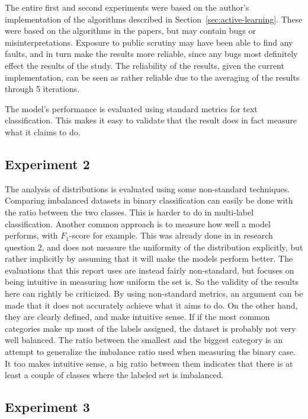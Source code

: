 The entire first and second experiments were based on the author's implementation of the algorithms described in Section~\ref{sec:active-learning}.
These were based on the algorithms in the papers, but may contain bugs or misinterpretations.
Exposure to public scrutiny may have been able to find any faults, and in turn make the results more reliable, since any bugs most definitely effect the results of the study.
The reliability of the results, given the current implementation, can be seen as rather reliable due to the averaging of the results through 5 iterations.

The model's performance is evaluated using standard metrics for text classification.
This makes it easy to validate that the result does in fact measure what it claims to do.

\subsection{Experiment 2}

The analysis of distributions is evaluated using some non-standard techniques.
Comparing imbalanced datasets in binary classification can easily be done with the ratio between the two classes.
This is harder to do in multi-label classification. 
Another common approach is to measure how well a model performs, with $F_1$-score for example.
This was already done in in research question 2, and does not measure the uniformity of the distribution explicitly, but rather implicitly by assuming that it will make the models perform better.
The evaluations that this report uses are instead fairly non-standard, but focuses on being intuitive in measuring how uniform the set is.
So the validity of the results here can rightly be criticized.
By using non-standard metrics, an argument can be made that it does not accurately achieve what it aims to do.
On the other hand, they are clearly defined, and make intuitive sense.
If if the most common categories make up most of the labels assigned, the dataset is probably not very well balanced.
The ratio between the smallest and the biggest category is an attempt to generalize the imbalance ratio used when measuring the binary case.
It too makes intuitive sense, a big ratio between them indicates that there is at least a couple of classes where the labeled set is imbalanced.

\subsection{Experiment 3}

